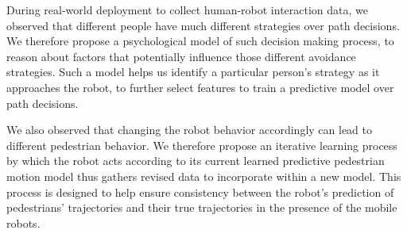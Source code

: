 \documentclass[conference]{IEEEtran}
\begin{document}

During real-world deployment to collect human-robot interaction data, we 
observed that different people have much different strategies over path 
decisions. We therefore propose a psychological model of such decision making 
process, to reason about factors that potentially influence those different avoidance 
strategies. Such a model helps us identify a particular person's strategy as it 
approaches the robot, to further select features to train a predictive model 
over path decisions.
 

We also observed that changing the robot behavior
accordingly can lead to different pedestrian behavior.  We therefore
propose an iterative learning process by which the robot acts
according to its current learned predictive pedestrian motion model
thus gathers revised data to incorporate within a new model.  This
process is designed to help ensure consistency between the robot's
prediction of pedestrians' trajectories and their true trajectories in
the presence of the mobile robots.



\end{document}
